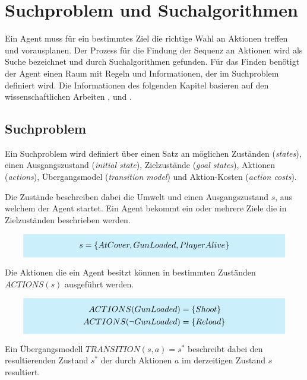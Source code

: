 \newcommand{\highlightbox}[2]{%
    \colorbox{cyan!20}{%
        \parbox{#1}{\vspace{0.5em}\centering #2\vspace{0.5em}}%
    }%
}

\chapter{Suchproblem und Suchalgorithmen}

Ein Agent muss für ein bestimmtes Ziel die richtige Wahl an Aktionen treffen und vorausplanen. Der Prozess für die Findung der Sequenz an Aktionen wird als Suche bezeichnet und durch Suchalgorithmen gefunden. Für das Finden benötigt der Agent einen Raum mit Regeln und Informationen, der im Suchproblem definiert wird. Die Informationen des folgenden Kapitel basieren auf den wissenschaftlichen Arbeiten \autocite{RN2020}, \autocite{4082128} und \autocite{Felner2011}.


\section{Suchproblem}

Ein Suchproblem wird definiert über einen Satz an möglichen Zuständen (\textit{states}), einen Ausgangszustand (\textit{initial state}), Zielzustände (\textit{goal states}), Aktionen (\textit{actions}), Übergangsmodel (\textit{transition model}) und Aktion-Kosten (\textit{action costs}).

Die Zustände beschreiben dabei die Umwelt und einen Ausgangszustand $s$, aus welchem der Agent startet. Ein Agent bekommt ein oder mehrere Ziele die in Zielzuständen beschrieben werden.

\[
\highlightbox{0.9\textwidth}{$
    \begin{aligned}
			s = \{AtCover, GunLoaded, PlayerAlive\}
    \end{aligned}
$}
\]

Die Aktionen die ein Agent besitzt können in bestimmten Zuständen $ACTIONS(s)$ ausgeführt werden.

\[
\highlightbox{0.9\textwidth}{$
    \begin{aligned}
			ACTIONS(GunLoaded) &= \{Shoot\} \\
			ACTIONS(\lnot GunLoaded) &= \{Reload\}
    \end{aligned}
$}
\]

Ein Übergangsmodell $TRANSITION(s,a) = s^*$ beschreibt dabei den resultierenden Zustand $s^*$ der durch Aktionen $a$ im derzeitigen Zustand $s$ resultiert.

